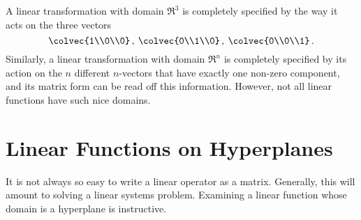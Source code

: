 A linear transformation with domain $\Re^3$ is completely specified by the way it acts on the three vectors 
\[
\colvec{1\\0\\0}\, ,\:\colvec{0\\1\\0}\, ,\:\colvec{0\\0\\1}\, .
\]
Similarly, a linear transformation with domain $\Re^n$ is completely specified by its action on the $n$ different $n$-vectors that have exactly one non-zero component, and its matrix form can be read off this information. However, not all linear functions have such nice domains.



\section{Linear Functions on Hyperplanes }
It is not always so easy to write a linear operator as a matrix. 
Generally, this will amount to solving a linear systems problem. Examining a linear function whose domain is a hyperplane is instructive.

